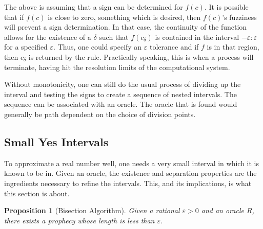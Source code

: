 \documentclass[12pt]{article}
\newtheorem{proposition}{Proposition}[section]
\begin{document}
The above is assuming that a sign can be determined for $f(c)$. It is possible that if $f(c)$ is close to zero, something which is desired, then $f(c)$'s fuzziness will prevent a sign determination. In that case, the continuity of the function allows for the existence of a $\delta$ such that $f(c_{\delta})$ is contained in the interval $-\varepsilon:\varepsilon$ for a specified $\varepsilon$. Thus, one could specify an $\varepsilon$ tolerance and if $f$ is in that region, then $c_\delta$ is returned by the rule. Practically speaking, this is when a process will terminate, having hit the resolution limits of the computational system. 

Without monotonicity, one can still do the usual process of dividing up the interval and testing the signs to create a sequence of nested intervals. The sequence can be associated with an oracle. The oracle that is found would generally be path dependent on the choice of division points. 

\subsection{Small Yes Intervals}

To approximate a real number well, one needs a very small interval in which it is known to be in. Given an oracle, the existence and separation properties are the ingredients necessary to refine the intervals. This, and its implications, is what this section is about. 


\begin{proposition}[Bisection Algorithm]
    Given a rational $\varepsilon >0$ and an oracle $R$, there exists a prophecy whose length is less than $\varepsilon$.
\end{proposition}
\end{document}

